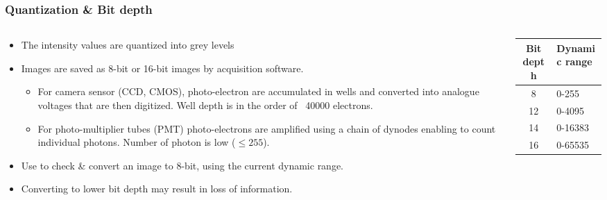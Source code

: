 \documentclass[ignorenonframetext,aspectratio=169,10pt,xcolor=table]{beamer}
\begin{document}
\begin{frame} \frametitle{Quantization \& Bit depth}

  \begin{columns}

    \begin{column}{0.7\textwidth}
      \begin{itemize} \setlength\itemsep{1em}
      \item The intensity values are quantized into grey levels
      \item Images are saved as 8-bit or 16-bit images by acquisition
        software.
        \begin{itemize}
        \item For camera sensor (CCD, CMOS), photo-electron are
          accumulated in wells and converted into analogue voltages that are
          then digitized. Well depth is in the order of ~40000 electrons.
        \item For photo-multiplier tubes (PMT) photo-electrons are
          amplified using a chain of dynodes enabling to count individual
          photons. Number of photon is low ($\leq 255$).
        \end{itemize}
      \end{itemize}
      \begin{itemize}
      \item Use  to check \& convert an image
        to 8-bit, using the current dynamic range.
      \item Converting to lower bit depth may result in loss of information.
      \end{itemize}
    \end{column}

    \begin{column}{0.3\textwidth}
      \begin{center} \small {}
        \begin{tabular}{cl}
          Bit depth & Dynamic range \\ \hline 8 &
          0-255 \\ 12 & 0-4095\\ 14 & 0-16383\\ 16 & 0-65535
        \end{tabular}
      \end{center}

    \end{column}

  \end{columns}

\end{frame}
\end{document}
